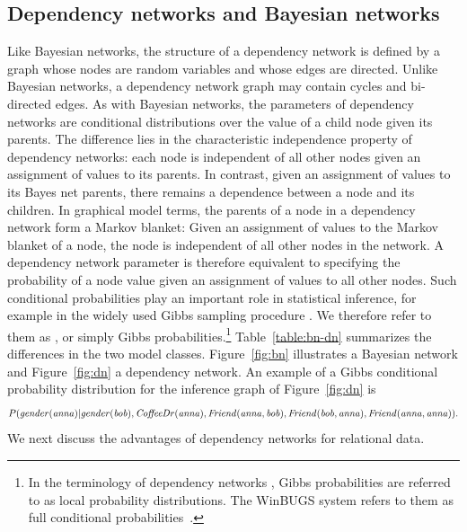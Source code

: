 \documentclass[runningheads,a4paper]{llncs}
\begin{document}
 \subsection{Dependency networks and Bayesian networks} Like Bayesian networks, the structure of a dependency network is defined by a graph whose nodes are random variables and whose edges are directed. Unlike Bayesian networks, a dependency network graph may contain cycles and bi-directed edges. As with Bayesian networks, the parameters of dependency networks are conditional distributions over the value of a child node given its parents. The difference lies in the characteristic independence property of dependency networks: each node is independent of all other nodes given an assignment of values to its parents. In contrast, given an assignment of values to its Bayes net parents, there remains a dependence between a node and its children. In graphical model terms, the parents of a node in a dependency network form a Markov blanket: Given an assignment of values to the Markov blanket of a node, the node is independent of all other nodes in the network. A dependency network parameter is therefore equivalent to specifying the probability of a node value given an assignment of values to all other nodes. Such conditional probabilities play an important role in statistical inference, for example in the widely used Gibbs sampling procedure \cite{Lunn2000}. We therefore refer to them as , or simply Gibbs probabilities.\footnote{In the terminology of dependency networks \cite{Heckerman2000},  Gibbs  probabilities are referred to as local probability distributions. The WinBUGS system refers to them as full conditional probabilities~\cite{Lunn2000}.} Table~\ref{table:bn-dn} summarizes the differences in the two model classes. Figure~\ref{fig:bn} illustrates a Bayesian network and Figure~\ref{fig:dn} a dependency network. An example of a Gibbs conditional probability distribution for the inference graph of Figure~\ref{fig:dn} is $$P(\it{gender}(anna)|\it{gender(bob)}, \it{CoffeeDr(anna)}, \it{Friend(anna,bob)},\it{Friend(bob,anna)},\it{Friend(anna,anna)}).$$ We next discuss the advantages of dependency networks for relational data.
 
\end{document}
